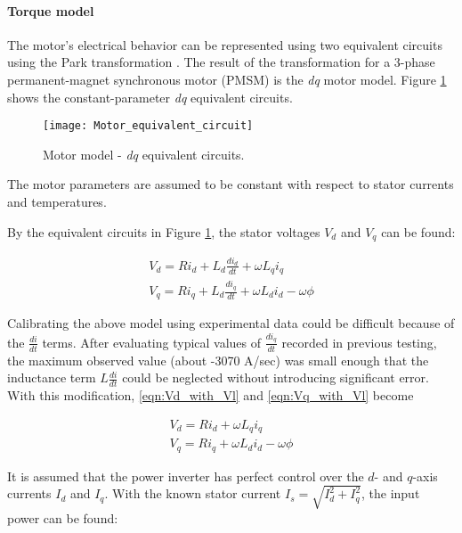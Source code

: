 \documentclass[../SimBALink.tex]{subfiles}
\begin{document}
	\paragraph{Torque model}
		The motor's electrical behavior can be represented using two equivalent circuits using the Park transformation \cite{Park1929}. The result of the transformation for a 3-phase permanent-magnet synchronous motor (PMSM) is the \textit{dq} motor model. Figure \ref{fig:Motor_equivalent_circuit} shows the constant-parameter \textit{dq} equivalent circuits.
		
		\begin{figure}[h]
			\centering
			\texttt{[image: Motor\_equivalent\_circuit]}
			\caption{Motor model - \textit{dq} equivalent circuits.}
			\label{fig:Motor_equivalent_circuit}
		\end{figure}
		\FloatBarrier
		
		The motor parameters are assumed to be constant with respect to stator currents and temperatures.
		
		By the equivalent circuits in Figure \ref{fig:Motor_equivalent_circuit}, the stator voltages $V_d$ and $V_q$ can be found:
		
		\begin{gather}
			V_d		= R i_d + L_d \frac{ d i_d }{ d t } + \omega L_q i_q				\label{eqn:Vd_with_Vl}\\
			V_q		= R i_q + L_d \frac{ d i_q }{ d t } + \omega L_d i_d	- \omega \phi	\label{eqn:Vq_with_Vl}
		\end{gather}
		
		Calibrating the above model using experimental data could be difficult because of the $\frac{d i}{d t}$ terms. After evaluating typical values of $\frac{d i_q}{d t}$ recorded in previous testing, the maximum observed value (about -3070 A/sec) was small enough that the inductance term $L \frac{d i}{d t}$ could be neglected without introducing significant error. With this modification, \ref{eqn:Vd_with_Vl} and \ref{eqn:Vq_with_Vl} become
		
		\begin{gather}
			V_d		= R i_d + \omega L_q i_q				\label{eqn:Vd_without_Vl}\\
			V_q		= R i_q + \omega L_d i_d - \omega \phi		\label{eqn:Vq_without_Vl}
		\end{gather}
		
		It is assumed that the power inverter has perfect control over the $d$- and $q$-axis currents $I_d$ and $I_q$. With the known stator current $I_s = \sqrt{I_d^2 + I_q^2}$, the input power can be found:
		
\end{document}
